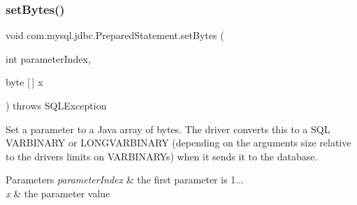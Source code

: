 \subsubsection{\texorpdfstring{set\+Bytes()}{setBytes()}}
{\footnotesize\ttfamily void com.\+mysql.\+jdbc.\+Prepared\+Statement.\+set\+Bytes (\begin{DoxyParamCaption}\item[{int}]{parameter\+Index,  }\item[{byte \mbox{[}$\,$\mbox{]}}]{x }\end{DoxyParamCaption}) throws S\+Q\+L\+Exception}

Set a parameter to a Java array of bytes. The driver converts this to a S\+QL V\+A\+R\+B\+I\+N\+A\+RY or L\+O\+N\+G\+V\+A\+R\+B\+I\+N\+A\+RY (depending on the argument\textquotesingle{}s size relative to the driver\textquotesingle{}s limits on V\+A\+R\+B\+I\+N\+A\+R\+Ys) when it sends it to the database.


\begin{DoxyParams}{Parameters}
{\em parameter\+Index} & the first parameter is 1... \\
\hline
{\em x} & the parameter value\\
\hline
\end{DoxyParams}

